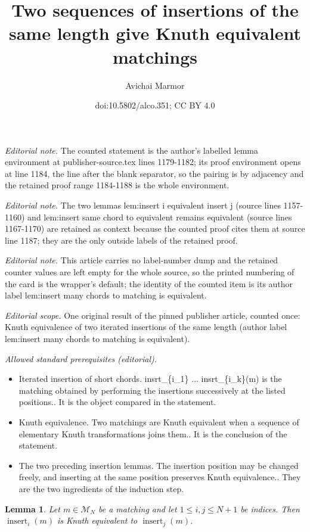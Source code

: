 \documentclass[11pt]{article}
\title{Two sequences of insertions of the same length give Knuth equivalent matchings}
\author{Avichai Marmor}
\date{doi:10.5802/alco.351; CC BY 4.0}
\newtheorem{lemma}[theo]{Lemma}
\theoremstyle{definition}
\numberwithin{equation}{section}
\newcommand{\insrt}{\operatorname{insert}}
\newcommand{\M}{\mathcal{M}}
\begin{document}
\maketitle
\noindent\textit{Editorial note.} The counted statement is the author's labelled lemma environment at publisher-source.tex lines 1179-1182; its proof environment opens at line 1184, the line after the blank separator, so the pairing is by adjacency and the retained proof range 1184-1188 is the whole environment.\par\medskip
\noindent\textit{Editorial note.} The two lemmas lem:insert i equivalent insert j (source lines 1157-1160) and lem:insert same chord to equivalent remains equivalent (source lines 1167-1170) are retained as context because the counted proof cites them at source line 1187; they are the only outside labels of the retained proof.\par\medskip
\noindent\textit{Editorial note.} This article carries no label-number dump and the retained counter values are left empty for the whole source, so the printed numbering of the card is the wrapper's default; the identity of the counted item is its author label lem:insert many chords to matching is equivalent.\par\medskip
\noindent\textit{Editorial scope.} One original result of the pinned publisher article, counted once: Knuth equivalence of two iterated insertions of the same length (author label lem:insert many chords to matching is equivalent).\par\medskip
\noindent\textit{Allowed standard prerequisites (editorial).}\begin{itemize}
\item Iterated insertion of short chords. insrt\_\{i\_1\} ... insrt\_\{i\_k\}(m) is the matching obtained by performing the insertions successively at the listed positions.. It is the object compared in the statement.
\item Knuth equivalence. Two matchings are Knuth equivalent when a sequence of elementary Knuth transformations joins them.. It is the conclusion of the statement.
\item The two preceding insertion lemmas. The insertion position may be changed freely, and inserting at the same position preserves Knuth equivalence.. They are the two ingredients of the induction step.
\end{itemize}\medskip
\begin{lemma}
\label{lem:insert i equivalent insert j}
    Let $m \in \M_N$ be a matching and let $1 \le i,j \le N+1$ be indices. Then $\insrt_i(m)$ is Knuth equivalent to $\insrt_j(m)$.
\end{lemma}
\end{document}
